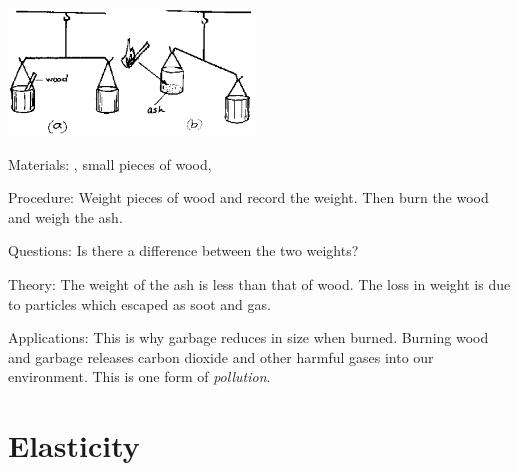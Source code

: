 \begin{multicols}{2}
\begin{center}
\includegraphics[width=0.49\textwidth]{./img/source/weighing-particles.png}
\end{center}

\begin{description*}
\item[Materials:]{, small pieces of wood, }
\item[Procedure:]{Weight pieces of wood and record the weight. Then burn the wood and weigh the ash.}
\item[Questions:]{Is there a difference between the two weights?}
\item[Theory:]{The weight of the ash is less than that of wood. The loss in weight is due to particles which escaped as soot and gas.}
\item[Applications:]{This is why garbage reduces in size when burned. Burning wood and garbage releases carbon dioxide and other harmful gases into our environment. This is one form of \emph{pollution}.}
\end{description*}


\section*{Elasticity}



\end{multicols}
